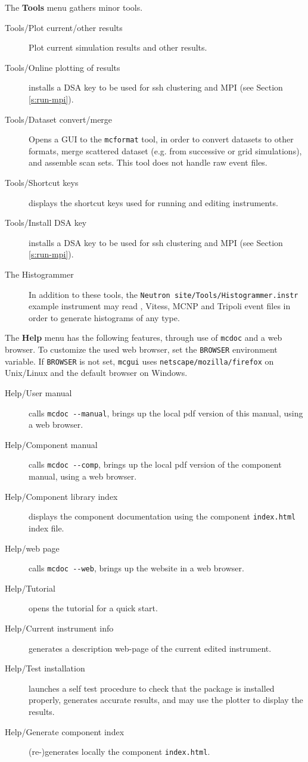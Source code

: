\noindent The \textbf{Tools} menu gathers minor tools.
\begin{description}
\item[Tools/Plot current/other results] Plot current simulation results and
  other results.
\item[Tools/Online plotting of results] installs a DSA key to be used for ssh
  clustering and MPI (see Section \ref{s:run-mpi}).
\item[Tools/Dataset convert/merge] Opens a GUI to the \verb+mcformat+ tool, in
  order to convert datasets to other formats, merge scattered dataset (e.g. from
  successive or grid simulations), and assemble scan sets. This tool does not
  handle raw event files.
\item[Tools/Shortcut keys] displays the shortcut keys used for running and
  editing instruments.
\item[Tools/Install DSA key] installs a DSA key to be used for ssh clustering
  and MPI (see Section \ref{s:run-mpi}).
\item[The Histogrammer] In addition to these tools, the
  \verb+Neutron site/Tools/Histogrammer.instr+ example instrument may read
  \MCS, Vitess, MCNP and Tripoli event files in order to generate histograms
  of any type.
\end{description}


\noindent The \textbf{Help} menu has the following features, through use of
\verb+mcdoc+ and a web browser. To customize the used web browser, set
the \verb+BROWSER+ environment variable. If \verb+BROWSER+ is not set,
\verb+mcgui+ uses \verb+netscape/mozilla/firefox+ on Unix/Linux and the default browser on
Windows.
\begin{description}
\item[Help/\MCS User manual] calls \verb+mcdoc --manual+, brings up the local
  pdf version of this manual, using a web browser.
\item[Help/\MCS Component manual] calls \verb+mcdoc --comp+, brings up the local
  pdf version of the component manual, using a web browser.
\item[Help/Component library index] displays the component documentation using
  the component \verb+index.html+ index file.
\item[Help/\MCS web page] calls \verb+mcdoc --web+, brings up the \MCS
  website in a web browser.
\item[Help/Tutorial] opens the \MCS tutorial for a quick start.
\item[Help/Current instrument info] generates a description web-page of the
  current edited instrument.
\item[Help/Test \MCS installation] launches a self test procedure to check that
  the \MCS package is installed properly, generates accurate results, and may
  use the plotter to display the results.
\item[Help/Generate component index] (re-)generates locally the component
  \verb+index.html+.
\end{description}



